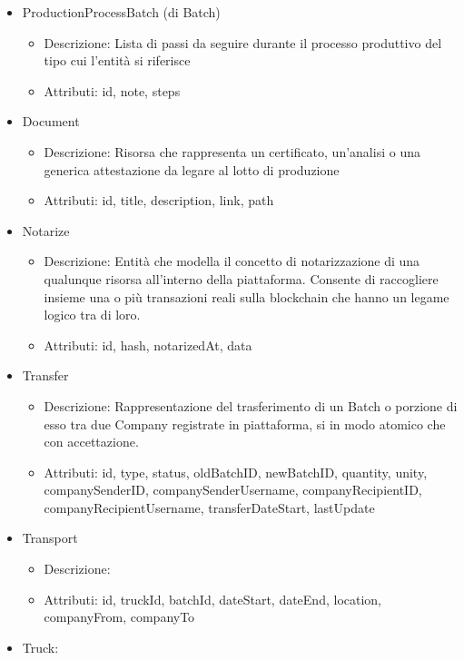 \documentclass[a4paper,11pt]{article}
\begin{document}
\begin{itemize}
\begin{itemize}
        \end{itemize}
  \item ProductionProcessBatch (di Batch)
        \begin{itemize}
          \item Descrizione: Lista di passi da seguire durante il processo produttivo del tipo cui l'entità si riferisce
          \item Attributi: id, note, steps
        \end{itemize}
  \item Document
        \begin{itemize}
          \item Descrizione: Risorsa che rappresenta un certificato, un'analisi o una generica attestazione da legare al lotto di produzione
          \item Attributi: id, title, description, link, path
        \end{itemize}
  \item Notarize
        \begin{itemize}
          \item Descrizione: Entità che modella il concetto di notarizzazione di una qualunque risorsa all'interno della piattaforma. Consente di raccogliere insieme una o più transazioni reali sulla blockchain che hanno un legame logico tra di loro.
          \item Attributi: id, hash, notarizedAt, data
        \end{itemize}
  \item Transfer
        \begin{itemize}
          \item Descrizione: Rappresentazione del trasferimento di un Batch o porzione di esso tra due Company registrate in piattaforma, si in modo atomico che con accettazione.
          \item Attributi: id, type, status, oldBatchID, newBatchID, quantity, unity, companySenderID, companySenderUsername, companyRecipientID, companyRecipientUsername, transferDateStart, lastUpdate
        \end{itemize}
  \item Transport
        \begin{itemize}
          \item Descrizione:
          \item Attributi: id, truckId, batchId, dateStart, dateEnd, location, companyFrom, companyTo
        \end{itemize}
  \item Truck:

\end{itemize}
\end{document}
